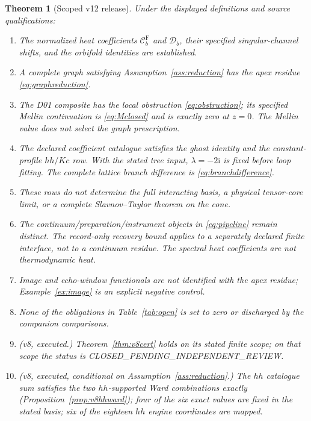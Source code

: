 \documentclass[11pt,a4paper]{article}
\newcommand{\ii}{\mathrm i}
\newcommand{\Fr}{\mathrm F}
\newcommand{\CPIR}{\textsf{CLOSED\_PENDING\_}\allowbreak\textsf{INDEPENDENT\_REVIEW}}
\newcommand{\Ccal}{\mathcal C}
\newcommand{\Dcal}{\mathcal D}
\theoremstyle{plain}
\newtheorem{theorem}{Theorem}[section]
\theoremstyle{definition}
\theoremstyle{remark}
\numberwithin{equation}{section}
\begin{document}
\begin{theorem}[Scoped v12 release]
\label{thm:release}
Under the displayed definitions and source qualifications:
\begin{enumerate}[label=\textup{(\roman*)}]
\item The normalized heat coefficients \(\Ccal_b^\Fr\) and
\(\Dcal_b\), their specified singular-channel shifts, and the
orbifold identities are established.

\item A complete graph satisfying
Assumption~\ref{ass:reduction} has the apex residue
\eqref{eq:graphreduction}.

\item The D01 composite has the local obstruction
\eqref{eq:obstruction}; its specified Mellin continuation is
\eqref{eq:Mclosed} and is exactly zero at \(z=0\).
The Mellin value does not select the graph prescription.

\item The declared coefficient catalogue satisfies the ghost
identity and the constant-profile \(hh/Kc\) row.
With the stated tree input,
\(\lambda=-2\ii\) is fixed before loop fitting.
The complete lattice branch difference is
\eqref{eq:branchdifference}.

\item These rows do not determine the full interacting basis,
a physical tensor-core limit, or a complete Slavnov--Taylor
theorem on the cone.

\item The continuum/preparation/instrument objects in
\eqref{eq:pipeline} remain distinct.
The record-only recovery bound applies to a separately declared
finite interface, not to a continuum residue.
The spectral heat coefficients are not thermodynamic heat.

\item Image and echo-window functionals are not identified with
the apex residue; Example~\ref{ex:image} is an explicit negative
control.

\item None of the obligations in Table~\ref{tab:open} is set to
zero or discharged by the companion comparisons.

\item \emph{(v8, executed.)} Theorem~\ref{thm:v8cert} holds on its
stated finite scope; on that scope the status is \CPIR.

\item \emph{(v8, executed, conditional on
Assumption~\ref{ass:reduction}.)} The \(hh\) catalogue sum satisfies
the two \(hh\)-supported Ward combinations exactly
(Proposition~\ref{prop:v8hhward}); four of the six exact values are
fixed in the stated basis; six of the eighteen \(hh\) engine
coordinates are mapped.


\end{enumerate}
\end{theorem}
\end{document}
